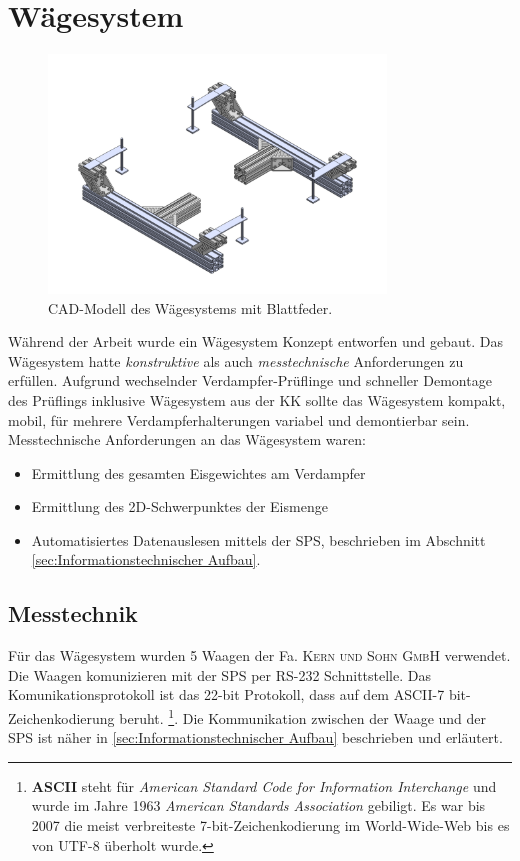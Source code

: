 
\section{Wägesystem}
\label{sec:Waegesystem}

\begin{figure}[htb]
\centering		\includegraphics[width=0.80\textwidth]{Pictures/Waage_2Ansichten.pdf}
\caption{CAD-Modell des Wägesystems mit Blattfeder.}
\label{fig:}
\end{figure}

Während der Arbeit wurde ein Wägesystem Konzept entworfen und gebaut. Das Wägesystem hatte \textit{konstruktive} als auch \textit{messtechnische} Anforderungen zu erfüllen. Aufgrund wechselnder Verdampfer-Prüflinge und schneller Demontage des Prüflings inklusive Wägesystem aus der KK sollte das Wägesystem  kompakt, mobil, für mehrere Verdampferhalterungen variabel und demontierbar sein. 
Messtechnische Anforderungen an das Wägesystem waren:

\begin{itemize}
\item Ermittlung des gesamten Eisgewichtes am Verdampfer
\item Ermittlung des 2D-Schwerpunktes der Eismenge
\item Automatisiertes Datenauslesen mittels der SPS, beschrieben im Abschnitt \ref{sec:Informationstechnischer Aufbau}.
\end{itemize}

\subsection{Messtechnik}
\label{subsec:Waagen-Messtechnik}

Für das Wägesystem wurden 5 Waagen der Fa. \textsc{Kern und Sohn GmbH} verwendet. Die Waagen komunizieren mit der SPS per RS-232 Schnittstelle. Das Komunikationsprotokoll ist das 22-bit Protokoll, dass auf dem \textsc{ASCII}-7 bit- Zeichenkodierung beruht. \footnote{\textbf{ASCII} steht für \textit{American Standard Code for Information Interchange} und wurde im Jahre 1963  \textit{American Standards Association} gebiligt. Es war bis 2007 die meist verbreiteste 7-bit-Zeichenkodierung im World-Wide-Web bis es von UTF-8 überholt wurde.}. Die Kommunikation zwischen der Waage und der SPS ist näher in \ref{sec:Informationstechnischer Aufbau} beschrieben und erläutert.

